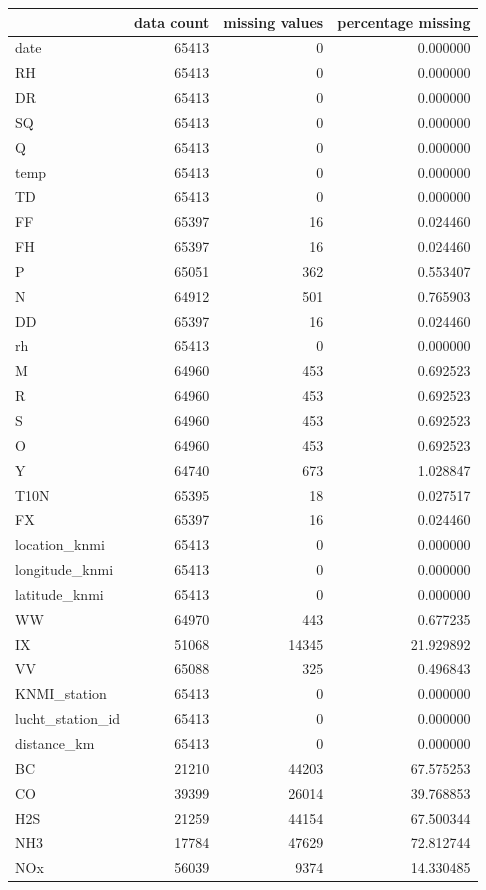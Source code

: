 \begin{tabular}{lrrr}
\toprule
 & data count & missing values & percentage missing \\
\midrule
date & 65413 & 0 & 0.000000 \\
RH & 65413 & 0 & 0.000000 \\
DR & 65413 & 0 & 0.000000 \\
SQ & 65413 & 0 & 0.000000 \\
Q & 65413 & 0 & 0.000000 \\
temp & 65413 & 0 & 0.000000 \\
TD & 65413 & 0 & 0.000000 \\
FF & 65397 & 16 & 0.024460 \\
FH & 65397 & 16 & 0.024460 \\
P & 65051 & 362 & 0.553407 \\
N & 64912 & 501 & 0.765903 \\
DD & 65397 & 16 & 0.024460 \\
rh & 65413 & 0 & 0.000000 \\
M & 64960 & 453 & 0.692523 \\
R & 64960 & 453 & 0.692523 \\
S & 64960 & 453 & 0.692523 \\
O & 64960 & 453 & 0.692523 \\
Y & 64740 & 673 & 1.028847 \\
T10N & 65395 & 18 & 0.027517 \\
FX & 65397 & 16 & 0.024460 \\
location_knmi & 65413 & 0 & 0.000000 \\
longitude_knmi & 65413 & 0 & 0.000000 \\
latitude_knmi & 65413 & 0 & 0.000000 \\
WW & 64970 & 443 & 0.677235 \\
IX & 51068 & 14345 & 21.929892 \\
VV & 65088 & 325 & 0.496843 \\
KNMI_station & 65413 & 0 & 0.000000 \\
lucht_station_id & 65413 & 0 & 0.000000 \\
distance_km & 65413 & 0 & 0.000000 \\
BC & 21210 & 44203 & 67.575253 \\
CO & 39399 & 26014 & 39.768853 \\
H2S & 21259 & 44154 & 67.500344 \\
NH3 & 17784 & 47629 & 72.812744 \\
NOx & 56039 & 9374 & 14.330485 \\

\end{tabular}
